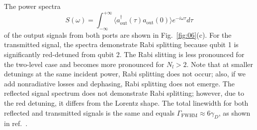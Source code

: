 \documentclass[lettersize,journal]{IEEEtran}
\begin{document}
The power spectra
\begin{equation} \label{eq:22}
S(\omega) = \int_{-\infty}^{+\infty} \langle a_\mathrm{out}^\dag(\tau) a_\mathrm{out}(0) \rangle e^{-i \omega \tau} d\tau
\end{equation}
of the output signals from both ports are shown in Fig.~\ref{fig:06}(c).
For the transmitted signal, the spectra demonstrate Rabi splitting because qubit 1 is significantly red-detuned from qubit 2.
The Rabi slitting is less pronounced for the two-level case and becomes more pronounced for $N_l > 2$.
Note that at smaller detunings at the same incident power, Rabi splitting does not occur; also, if we add nonradiative losses and dephasing, Rabi splitting does not emerge.
The reflected signal spectrum does not demonstrate Rabi splitting; however, due to the red detuning, it differs from the Lorentz shape.
The total linewidth for both reflected and transmitted signals is the same and equals $\Gamma_\mathrm{FWHM} \approx 6 \gamma_D$, as shown in ref.~\cite{rosario_hamann_nonreciprocity_2018}.
\end{document}
